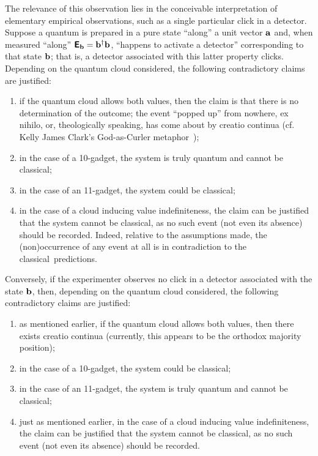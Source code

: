 The relevance of this observation lies in the conceivable interpretation of elementary empirical observations,
such as a single particular click in a detector.
Suppose a quantum is prepared in a pure state ``along'' a unit vector ${\bf a}$ and, when measured ``along''
$\textsf{\textbf{E}}_{\bf b}={\bf b}^\dagger {\bf b}$,
``happens to activate a detector'' corresponding to that state ${\bf b}$;
that is, a detector associated with this latter property clicks.
Depending on the quantum cloud considered, the following contradictory claims are justified:
\begin{enumerate}
\item
if the quantum cloud allows both values, then the claim is that there is no determination of the outcome; the event ``popped up'' from nowhere, {ex nihilo},
or, theologically speaking, has come about by {creatio continua} (cf. Kelly James Clark's God-as-Curler metaphor~\cite{Clark-2017-GodAsCurler});
\item
in the case of a 10-gadget, the system is truly quantum and cannot be classical;
\item
in the case of an 11-gadget, the system could be classical;
\item
in the case of a cloud inducing value indefiniteness, the claim can be justified that the system cannot be classical, as no such event (not even its absence)
should be recorded. Indeed, relative to the assumptions made, the (non)occurrence of any event at all is in contradiction to the classical~predictions.
\end{enumerate}

Conversely, if the experimenter observes no click in a detector associated with the state $ {\bf b} $,
then, depending on the quantum cloud considered, the following contradictory claims are justified:
\begin{enumerate}
\item
as mentioned earlier, if the quantum cloud allows both values, then there exists {creatio continua}
(currently, this appears to be the orthodox majority position);
\item
in the case of a 10-gadget, the system could be classical;
\item
in the case of an 11-gadget, the system is truly quantum and cannot be classical;
\item
just as mentioned earlier, in the case of a cloud inducing value indefiniteness, the claim can be justified that the system cannot be classical, as no such event (not even its absence)
should be recorded.
\end{enumerate}


